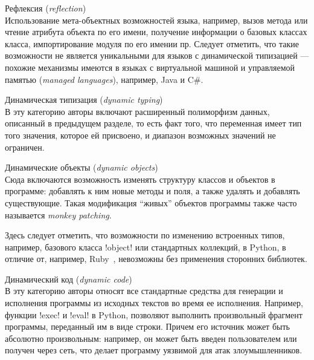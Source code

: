\begin{description}
  \item Рефлексия (\emph{reflection}) \\ \hfill
      Использование мета-объектных возможностей языка, например,
      вызов метода или чтение атрибута объекта по его имени, получение
      информации о базовых классах класса, импортирование модуля по его имении
      пр. Следует отметить, что такие возможности не является уникальными для
      языков с динамической типизацией --- похожие механизмы имеются в языках с
      виртуальной машиной и управляемой памятью (\emph{managed languages}),
      например, Java и C\#.

  \item Динамическая типизация (\emph{dynamic typing}) \\ \hfill
      В эту категорию авторы включают расширенный полиморфизм данных, описанный
      в предыдущем разделе, то есть факт того, что переменная имеет тип того
      значения, которое ей присвоено, и диапазон возможных значений не
      ограничен.

  \item Динамические объекты (\emph{dynamic objects}) \\ \hfill
      Сюда включаются возможность изменять структуру классов и объектов в
      программе: добавлять к ним новые методы и поля, а также удалять и добавлять
      существующие. Такая модификация ``живых'' объектов программы также часто
      называется \emph{monkey patching}.

      Здесь следует отметить, что возможности по изменению встроенных
      типов, например, базового класса !object! или стандартных коллекций, в Python, в
      отличие от, например, Ruby~\cite{Madsen2007}, невозможны без применения сторонних библиотек.
      
  \item Динамический код (\emph{dynamic code}) \\ \hfill
      В эту категорию авторы относят все стандартные средства для генерации и
      исполнения программы из исходных текстов во время ее исполнения.
      Например, функции !exec! и !eval! в Python, позволяют выполнить
      произвольный фрагмент программы, переданный им в виде строки.  Причем его
      источник может быть абсолютно произвольным: например, он может быть введен
      пользователем или получен через сеть, что делает программу уязвимой для
      атак злоумышленников.


\end{description}
